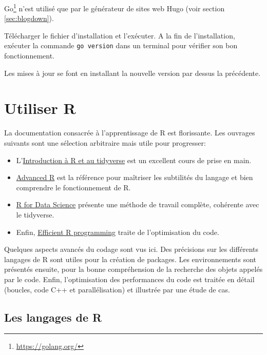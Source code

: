 \documentclass[
  12pt,
  french,
  a4paper,
  extrafontsizes,onecolumn,openright
  ]{memoir}
\providecommand{\tightlist}{%
  \setlength{\itemsep}{0pt}\setlength{\parskip}{0pt}}
\newlength{\rf}
\begin{document}
Go\footnote{\url{https://golang.org/}} n'est utilisé que par le générateur de sites web Hugo (voir section \ref{sec:blogdown}).

Télécharger le fichier d'installation et l'exécuter.
A la fin de l'installation, exécuter la commande \texttt{go\ version} dans un terminal pour vérifier son bon fonctionnement.

Les mises à jour se font en installant la nouvelle version par dessus la précédente.

\hypertarget{chap:utiliseR}{%
\chapter{Utiliser R}\label{chap:utiliseR}}

La documentation consacrée à l'apprentissage de R est florissante.
Les ouvrages suivants sont une sélection arbitraire mais utile pour progresser:

\begin{itemize}
\tightlist
\item
  L'\href{https://juba.github.io/tidyverse/}{Introduction à R et au tidyverse} \autocite{Barnier2020} est un excellent cours de prise en main.
\item
  \href{http://adv-r.had.co.nz/}{Advanced R} \autocite{Wickham2014} est la référence pour maîtriser les subtilités du langage et bien comprendre le fonctionnement de R.
\item
  \href{https://r4ds.had.co.nz/}{R for Data Science} \autocite{Wickham2016} présente une méthode de travail complète, cohérente avec le tidyverse.
\item
  Enfin, \href{https://csgillespie.github.io/efficientR/}{Efficient R programming} \autocite{Gillespie2016} traite de l'optimisation du code.
\end{itemize}

Quelques aspects avancés du codage sont vus ici.
Des précisions sur les différents langages de R sont utiles pour la création de packages.
Les environnements sont présentés ensuite, pour la bonne compréhension de la recherche des objets appelés par le code.
Enfin, l'optimisation des performances du code est traitée en détail (boucles, code C++ et parallélisation) et illustrée par une étude de cas.

\hypertarget{les-langages-de-r}{%
\section{Les langages de R}\label{les-langages-de-r}}
\end{document}
